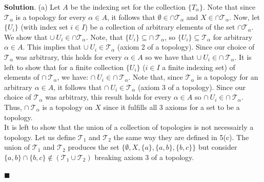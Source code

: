 \documentclass[12pt]{article}
\renewcommand{\=}[1]{\stackrel{#1}{=}} %
\providecommand{\T}{\mathcal{T}}
\theoremstyle{definition}
\newenvironment{s}{%
        \begin{trivlist} \item \textbf{Solution}. }{%
            \hspace*{\fill} $\blacksquare$\end{trivlist}}%
\begin{document}
\begin{s}
    (a) Let $A$ be the indexing set for the collection $\{T_{\alpha}\}$. Note that since $\T_{\alpha}$ is a topology
    for every $\alpha\in A$, it follows that $\emptyset \in \cap \T_{\alpha}$ and $X\in \cap\T_{\alpha}$. Now, let $\{U_i\}$
    (with index set $i\in I$) be a collection of arbitrary elements of the set $\cap\T_{\alpha}$. We show that 
    $\cup\: U_i \in \cap \T_{\alpha}$. Note, that $\{U_i\}\subseteq\cap\:\T_{\alpha}$, so $\{U_i\}\subseteq\T_{\alpha}$
    for arbitrary $\alpha\in A$. This implies that $\cup\:U_i\in\T_{\alpha}$ (axiom 2 of a topology). Since our choice 
    of $\T_{\alpha}$ was arbitrary, this holds for every $\alpha\in A$ so we have that $\cup\:U_i\in\cap\:\T_{\alpha}$. It is left
    to show that for a finite collection $\{U_i\}$ ($i\in I$ a finite indexing set) of elements of $\cap\:\T_{\alpha}$, we have:
    $\cap\:U_i\in\cap\:\T_{\alpha}$. Note that, since $\T_{\alpha}$ is a topology for an arbitrary $\alpha\in A$, it follows
    that $\cap\:U_i\in\T_{\alpha}$ (axiom 3 of a topology). Since our
    choice of $\T_{\alpha}$ was arbitrary, this result holds for every $\alpha\in A$ so $\cap\:U_i \in \cap\: \T_{\alpha}$.
    Thus, $\cap\:\T_{\alpha}$ is a topology on $X$ since it fulfills all 3 axioms for a set to be a topology. \\
    It is left to show that the union of a collection of topologies is not necessairly a topology.
    Let us define $\T_1$ and $\T_2$ the same way they are defined in 5(c). The union of $\T_1$ and $\T_2$ produces the set
    $\{\emptyset, X, \{a\}, \{a,b\}, \{b,c\}\}$ but consider $\{a,b\}\cap\{b,c\}\not\in(\T_1\cup\T_2)$ breaking axiom 3 of a topology.


\end{s}
\end{document}
